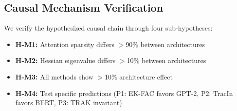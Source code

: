 \subsection{Causal Mechanism Verification}

We verify the hypothesized causal chain through four sub-hypotheses:
\begin{itemize}
    \item \textbf{H-M1:} Attention sparsity differs $>$90\% between architectures
    \item \textbf{H-M2:} Hessian eigenvalue differs $>$10\% between architectures
    \item \textbf{H-M3:} All methods show $>$10\% architecture effect
    \item \textbf{H-M4:} Test specific predictions (P1: EK-FAC favors GPT-2, P2: TracIn favors BERT, P3: TRAK invariant)
\end{itemize}
